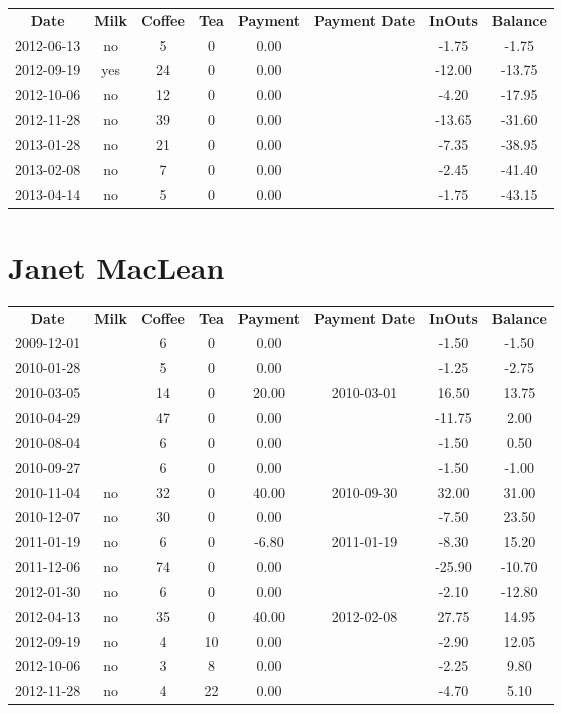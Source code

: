 \begin{center}
\begin{tabular}{cccccccc}
\textbf{Date} & \textbf{Milk} & \textbf{Coffee} & \textbf{Tea} & \textbf{Payment} & \textbf{Payment Date} & \textbf{InOuts} & \textbf{Balance} \\
2012-06-13 & no &  5 & 0 & 0.00 &  &  -1.75 &  -1.75\\ 
2012-09-19 & yes & 24 & 0 & 0.00 &  & -12.00 & -13.75\\ 
2012-10-06 & no & 12 & 0 & 0.00 &  &  -4.20 & -17.95\\ 
2012-11-28 & no & 39 & 0 & 0.00 &  & -13.65 & -31.60\\ 
2013-01-28 & no & 21 & 0 & 0.00 &  &  -7.35 & -38.95\\ 
2013-02-08 & no &  7 & 0 & 0.00 &  &  -2.45 & -41.40\\ 
2013-04-14 & no &  5 & 0 & 0.00 &  &  -1.75 & -43.15
\end{tabular}
\end{center}

\section{Janet MacLean}

\begin{center}
\begin{tabular}{cccccccc}
\textbf{Date} & \textbf{Milk} & \textbf{Coffee} & \textbf{Tea} & \textbf{Payment} & \textbf{Payment Date} & \textbf{InOuts} & \textbf{Balance} \\
2009-12-01 &  &  6 &  0 &  0.00 &  &  -1.50 &  -1.50\\ 
2010-01-28 &  &  5 &  0 &  0.00 &  &  -1.25 &  -2.75\\ 
2010-03-05 &  & 14 &  0 & 20.00 & 2010-03-01 &  16.50 &  13.75\\ 
2010-04-29 &  & 47 &  0 &  0.00 &  & -11.75 &   2.00\\ 
2010-08-04 &  &  6 &  0 &  0.00 &  &  -1.50 &   0.50\\ 
2010-09-27 &  &  6 &  0 &  0.00 &  &  -1.50 &  -1.00\\ 
2010-11-04 & no & 32 &  0 & 40.00 & 2010-09-30 &  32.00 &  31.00\\ 
2010-12-07 & no & 30 &  0 &  0.00 &  &  -7.50 &  23.50\\ 
2011-01-19 & no &  6 &  0 & -6.80 & 2011-01-19 &  -8.30 &  15.20\\ 
2011-12-06 & no & 74 &  0 &  0.00 &  & -25.90 & -10.70\\ 
2012-01-30 & no &  6 &  0 &  0.00 &  &  -2.10 & -12.80\\ 
2012-04-13 & no & 35 &  0 & 40.00 & 2012-02-08 &  27.75 &  14.95\\ 
2012-09-19 & no &  4 & 10 &  0.00 &  &  -2.90 &  12.05\\ 
2012-10-06 & no &  3 &  8 &  0.00 &  &  -2.25 &   9.80\\ 
2012-11-28 & no &  4 & 22 &  0.00 &  &  -4.70 &   5.10
\end{tabular}
\end{center}

